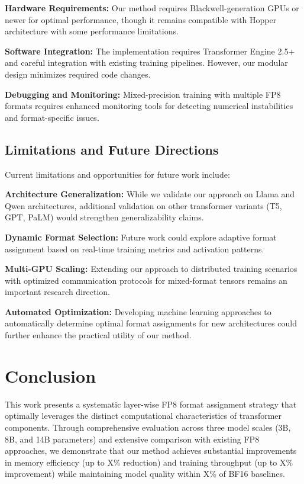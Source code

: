 \documentclass[conference]{IEEEtran}
\begin{document}
\textbf{Hardware Requirements:} Our method requires Blackwell-generation GPUs or newer for optimal performance, though it remains compatible with Hopper architecture with some performance limitations.

\textbf{Software Integration:} The implementation requires Transformer Engine 2.5+ and careful integration with existing training pipelines. However, our modular design minimizes required code changes.

\textbf{Debugging and Monitoring:} Mixed-precision training with multiple FP8 formats requires enhanced monitoring tools for detecting numerical instabilities and format-specific issues.

\subsection{Limitations and Future Directions}

Current limitations and opportunities for future work include:

\textbf{Architecture Generalization:} While we validate our approach on Llama and Qwen architectures, additional validation on other transformer variants (T5, GPT, PaLM) would strengthen generalizability claims.

\textbf{Dynamic Format Selection:} Future work could explore adaptive format assignment based on real-time training metrics and activation patterns.

\textbf{Multi-GPU Scaling:} Extending our approach to distributed training scenarios with optimized communication protocols for mixed-format tensors remains an important research direction.

\textbf{Automated Optimization:} Developing machine learning approaches to automatically determine optimal format assignments for new architectures could further enhance the practical utility of our method.

\section{Conclusion}

This work presents a systematic layer-wise FP8 format assignment strategy that optimally leverages the distinct computational characteristics of transformer components. Through comprehensive evaluation across three model scales (3B, 8B, and 14B parameters) and extensive comparison with existing FP8 approaches, we demonstrate that our method achieves substantial improvements in memory efficiency (up to X\% reduction) and training throughput (up to X\% improvement) while maintaining model quality within X\% of BF16 baselines.
\end{document}
